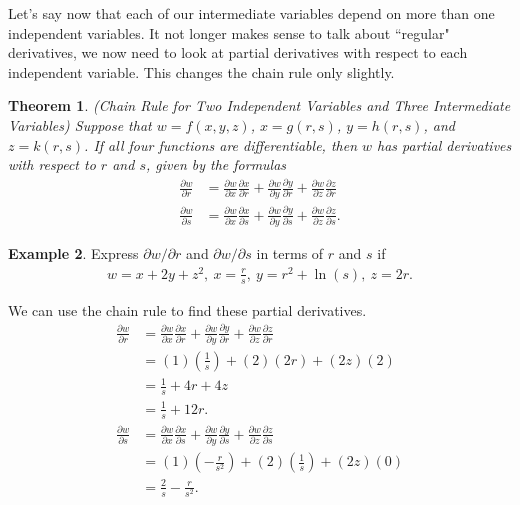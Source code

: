 \documentclass[12pt, letter]{article}
\theoremstyle{plain}
\newtheorem{theorem}{Theorem}
\numberwithin{theorem}{section}
\theoremstyle{definition}
\newtheorem{example}[theorem]{Example}
\begin{document}
\bigskip

\hrulefill

\bigskip

Let's say now that each of our intermediate variables depend on more than one independent variables. It not longer makes sense to talk about ``regular" derivatives, we now need to look at partial derivatives with respect to each independent variable. This changes the chain rule only slightly.

\bigskip

\begin{theorem}{(Chain Rule for Two Independent Variables and Three Intermediate Variables)}
Suppose that $w=f(x,y,z)$, $x=g(r,s)$, $y=h(r,s)$, and $z=k(r,s)$. If all four functions are differentiable, then $w$ has partial derivatives with respect to $r$ and $s$, given by the formulas
\begin{align*}
\frac{\partial w}{\partial r} &= \frac{\partial w}{\partial x}\frac{\partial x}{\partial r} + \frac{\partial w}{\partial y}\frac{\partial y}{\partial r} + \frac{\partial w}{\partial z}\frac{\partial z}{\partial r}\\
\frac{\partial w}{\partial s} &= \frac{\partial w}{\partial x}\frac{\partial x}{\partial s} + \frac{\partial w}{\partial y}\frac{\partial y}{\partial s} + \frac{\partial w}{\partial z}\frac{\partial z}{\partial s}.
\end{align*}
\end{theorem}

\bigskip

\hrulefill

\bigskip

\begin{example}
Express $\partial w / \partial r$ and $\partial w / \partial s$ in terms of $r$ and $s$ if
\begin{align*}
w=x+2y+z^2, \ x=\frac{r}{s}, \ y=r^2+\ln(s), \ z=2r.
\end{align*}

\smallskip

We can use the chain rule to find these partial derivatives.
\begin{align*}
\frac{\partial w}{\partial r} &= \frac{\partial w}{\partial x} \frac{\partial x}{\partial r} + \frac{\partial w}{\partial y} \frac{\partial y}{\partial r} + \frac{\partial w}{\partial z} \frac{\partial z}{\partial r}\\
&= (1)\left(\frac{1}{s}\right) + (2)(2r)+(2z)(2)\\
&= \frac{1}{s} + 4r+4z\\
&= \frac{1}{s} + 12r.\\
\frac{\partial w}{\partial s} &= \frac{\partial w}{\partial x} \frac{\partial x}{\partial s} + \frac{\partial w}{\partial y} \frac{\partial y}{\partial s} + \frac{\partial w}{\partial z} \frac{\partial z}{\partial s}\\
&= (1)\left(-\frac{r}{s^2}\right) + (2)\left(\frac{1}{s}\right)+(2z)(0)\\
&= \frac{2}{s} - \frac{r}{s^2}.
\end{align*}
\end{example}
\end{document}
